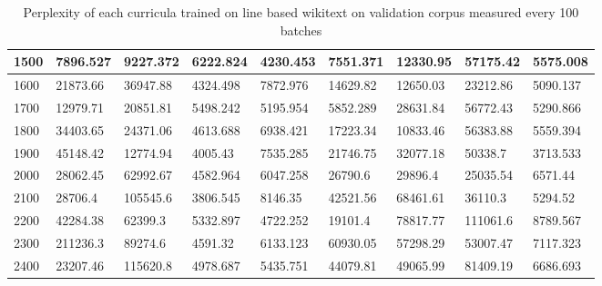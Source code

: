 \documentclass [11pt, proquest] {uwthesis}[2020/12/20]
\begin{document}
\begin{table}
\begin{tiny}
\begin{tabular}{|l|l|l|l|l|l|l|l|l|}
1500 & 7896.527 & 9227.372 & 6222.824 & 4230.453 & 7551.371 & 12330.95 & 57175.42 & 5575.008 \\ \hline
1600 & 21873.66 & 36947.88 & 4324.498 & 7872.976 & 14629.82 & 12650.03 & 23212.86 & 5090.137 \\ \hline
1700 & 12979.71 & 20851.81 & 5498.242 & 5195.954 & 5852.289 & 28631.84 & 56772.43 & 5290.866 \\ \hline
1800 & 34403.65 & 24371.06 & 4613.688 & 6938.421 & 17223.34 & 10833.46 & 56383.88 & 5559.394 \\ \hline
1900 & 45148.42 & 12774.94 & 4005.43 & 7535.285 & 21746.75 & 32077.18 & 50338.7 & 3713.533 \\ \hline
2000 & 28062.45 & 62992.67 & 4582.964 & 6047.258 & 26790.6 & 29896.4 & 25035.54 & 6571.44 \\ \hline
2100 & 28706.4 & 105545.6 & 3806.545 & 8146.35 & 42521.56 & 68461.61 & 36110.3 & 5294.52 \\ \hline
2200 & 42284.38 & 62399.3 & 5332.897 & 4722.252 & 19101.4 & 78817.77 & 111061.6 & 8789.567 \\ \hline
2300 & 211236.3 & 89274.6 & 4591.32 & 6133.123 & 60930.05 & 57298.29 & 53007.47 & 7117.323 \\ \hline
2400 & 23207.46 & 115620.8 & 4978.687 & 5435.751 & 44079.81 & 49065.99 & 81409.19 & 6686.693 \\ \hline
\end{tabular}
\caption{Perplexity of each curricula trained on line based wikitext on validation corpus measured every 100 batches}
\label{tab:wikitext2-line-perplexity}
\end{tiny}
\end{table}
\end{document}
